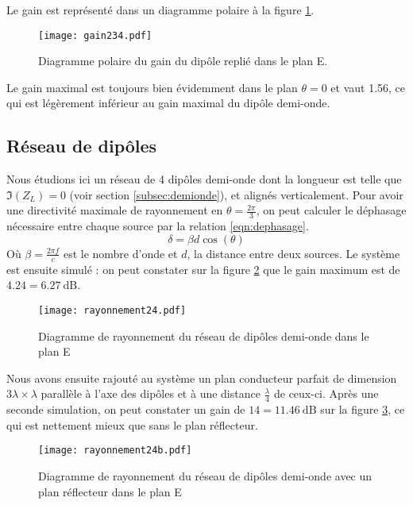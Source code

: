 Le gain est représenté dans un diagramme polaire à la figure \ref{fig:gain234}.
\begin{figure}[htbp]
  \centering
  \texttt{[image: gain234.pdf]}
  \caption{Diagramme polaire du gain du dipôle replié dans le plan E.\label{fig:gain234}}
\end{figure}
Le gain maximal est toujours bien évidemment dans le plan $\theta = 0$ et vaut \num{1.56}, ce qui est légèrement inférieur au gain maximal du dipôle demi-onde.

\subsection{Réseau de dipôles}
Nous étudions ici un réseau de 4 dipôles demi-onde dont la longueur est telle que $\Im(Z_L)=0$ (voir section \ref{subsec:demionde}), et alignés verticalement. Pour avoir une directivité maximale de rayonnement en $\theta=\frac{2\pi}{3}$, on peut calculer le déphasage nécessaire entre chaque source par la relation \ref{eqn:dephasage}.
\begin{equation}\label{eqn:dephasage}
\delta = \beta d \cos(\theta)
\end{equation}
Où $\beta = \frac{2\pi f}{c}$ est le nombre d'onde et $d$, la distance entre deux sources.
Le système est ensuite simulé : on peut constater sur la figure \ref{fig:rayonnement4} que le gain maximum est de $\num{4.24} = \SI{6.27}{\deci\bel}$.
\begin{figure}[htbp]
  \centering
  \texttt{[image: rayonnement24.pdf]}
  \caption{Diagramme de rayonnement du réseau de dipôles demi-onde dans le plan E\label{fig:rayonnement4}}
\end{figure}

Nous avons ensuite rajouté au système un plan conducteur parfait de dimension $3\lambda \times \lambda$ parallèle à l'axe des dipôles et à une distance $\frac{\lambda}{4}$ de ceux-ci. Après une seconde simulation, on peut constater un gain de $\num{14} = \SI{11.46}{\deci\bel}$ sur la figure \ref{fig:rayonnement4reflecteur}, ce qui est nettement mieux que sans le plan réflecteur.
\begin{figure}[htbp]
  \centering
  \texttt{[image: rayonnement24b.pdf]}
  \caption{Diagramme de rayonnement du réseau de dipôles demi-onde avec un plan réflecteur dans le plan E\label{fig:rayonnement4reflecteur}}
\end{figure}

